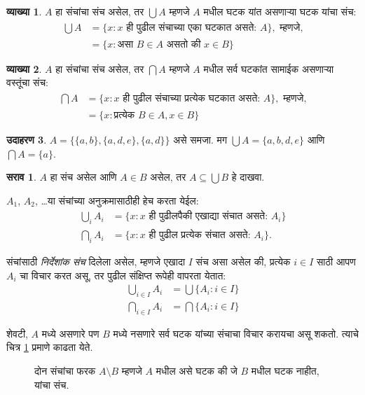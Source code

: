 \documentclass[11pt,a4paper,openany]{book}
\theoremstyle{definition}
\newtheorem{defn}{व्याख्या}[section]
\newtheorem{ex}[defn]{उदाहरण}
\newtheorem{prob}{सराव}[chapter]
\newcommand{\Setabs}[2]{\{#1:#2\}}
\newcommand{\olasset}[2][0.52\textwidth]{\centering\resizebox{#1}{!}{}}
\begin{document}
\begin{defn}
$A$ हा संचांचा संच असेल, तर $\bigcup A$ म्हणजे $A$ मधील
घटक यांत असणाऱ्या घटक यांचा संच:
\begin{align*}
\bigcup A & = \Setabs{x}{x \text{ ही पुढील संचाच्या एका घटकात असते: } A},
\text{ म्हणजे,}\\
& = \Setabs{x}{\text{असा } B \in A
  \text{ असतो की } x \in B}
\end{align*}
\end{defn}

\begin{defn}
$A$ हा संचांचा संच असेल, तर $\bigcap A$ म्हणजे $A$ मधील सर्व घटकांत
सामाईक असणाऱ्या वस्तूंचा संच:
\begin{align*}
\bigcap A & = \Setabs{x}{x \text{ ही पुढील संचाच्या प्रत्येक घटकात असते: } A},
\text{ म्हणजे,}\\
 & = \Setabs{x}{\text{प्रत्येक } B \in A, x \in B}
\end{align*}
\end{defn}

\begin{ex}
$A = \{ \{ a, b \}, \{ a, d, e \}, \{ a, d \} \}$ असे समजा.
मग $\bigcup A = \{ a, b, d, e \}$ आणि $\bigcap A = \{ a \}$.
\end{ex}
\begin{prob}
	$A$ हा संच असेल आणि $A \in B$ असेल, तर $A \subseteq \bigcup B$ हे दाखवा.
\end{prob}

$A_1$, $A_2$, \dots या संचांच्या अनुक्रमासाठीही हेच करता येईल:
\begin{align*}
\bigcup_i A_i & = \Setabs{x}{x \text{ ही पुढीलपैकी एखाद्या संचात असते: } A_i}\\
\bigcap_i A_i & = \Setabs{x}{x \text{ ही पुढील प्रत्येक संचात असते: } A_i}.
\end{align*}

संचांसाठी \emph{निर्देशांक संच} दिलेला असेल, म्हणजे एखादा $I$ संच असा असेल की,
प्रत्येक $i \in I$ साठी आपण $A_i$ चा विचार करत असू, तर पुढील संक्षिप्त
रूपेही वापरता येतात:
\begin{align*}
	\bigcup_{i \in I} A_i & = \bigcup \Setabs{A_i }{i \in I}\\
	\bigcap_{i \in I} A_i & = \bigcap\Setabs{A_i}{i \in I}
\end{align*}

शेवटी, $A$ मध्ये असणारे पण $B$ मध्ये नसणारे सर्व घटक यांच्या
संचाचा विचार करायचा असू शकतो. त्याचे चित्र \ref{sfr:set:uni:difference} प्रमाणे काढता येते.

\begin{figure}
  \olasset{assets/diagrams/difference.tikz}
  \caption{दोन संचांचा फरक $A \setminus B$ म्हणजे $A$ मधील असे
    घटक की जे $B$ मधील घटक नाहीत, यांचा संच.}
  \label{sfr:set:uni:difference}
\end{figure}
\end{document}

